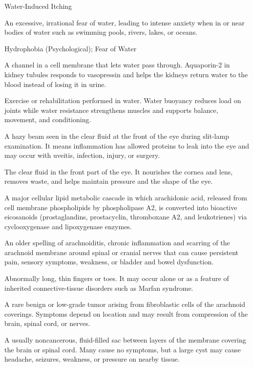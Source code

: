 \synonyms
Water-Induced Itching

 An excessive, irrational fear of water, leading to intense anxiety when in or near bodies of water such as swimming pools, rivers, lakes, or oceans.

\synonyms
Hydrophobia (Psychological); Fear of Water

 A channel in a cell membrane that lets water pass through. Aquaporin-2 in kidney tubules responds to vasopressin and helps the kidneys return water to the blood instead of losing it in urine.

 Exercise or rehabilitation performed in water. Water buoyancy reduces load on joints while water resistance strengthens muscles and supports balance, movement, and conditioning.

 A hazy beam seen in the clear fluid at the front of the eye during slit-lamp examination. It means inflammation has allowed proteins to leak into the eye and may occur with uveitis, infection, injury, or surgery.

 The clear fluid in the front part of the eye. It nourishes the cornea and lens, removes waste, and helps maintain pressure and the shape of the eye.

 A major cellular lipid metabolic cascade in which arachidonic acid, released from cell membrane phospholipids by phospholipase A2, is converted into bioactive eicosanoids (prostaglandins, prostacyclin, thromboxane A2, and leukotrienes) via cyclooxygenase and lipoxygenase enzymes.

 An older spelling of arachnoiditis, chronic inflammation and scarring of the arachnoid membrane around spinal or cranial nerves that can cause persistent pain, sensory symptoms, weakness, or bladder and bowel dysfunction.

 Abnormally long, thin fingers or toes. It may occur alone or as a feature of inherited connective-tissue disorders such as Marfan syndrome.

 A rare benign or low-grade tumor arising from fibroblastic cells of the arachnoid coverings. Symptoms depend on location and may result from compression of the brain, spinal cord, or nerves.

 A usually noncancerous, fluid-filled sac between layers of the membrane covering the brain or spinal cord. Many cause no symptoms, but a large cyst may cause headache, seizures, weakness, or pressure on nearby tissue.

